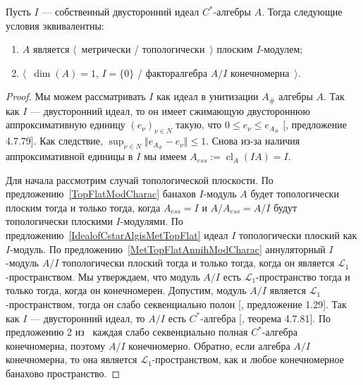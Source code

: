 \begin{proposition}\label{CStarAlgIsTopFlatOverItsIdeal} Пусть $I$ ---
собственный двусторонний идеал $C^*$-алгебры $A$. Тогда следующие условия
эквивалентны: 

\begin{enumerate}[label = (\roman*)]
    \item $A$ является $\langle$~метрически / топологически~$\rangle$ плоским
    $I$-модулем;

    \item $\langle$~$\operatorname{dim}(A)=1$, $I= \{0 \}$ / факторалгебра $A/I$
    конечномерна~$\rangle$.
\end{enumerate}
\end{proposition}
\begin{proof} Мы можем рассматривать $I$ как идеал в унитизации $A_\#$ алгебры
$A$. Так как $I$ --- двусторонний идеал, то он имеет сжимающую двустороннюю
аппроксимативную единицу ${(e_\nu)}_{\nu\in N}$ такую, что $0\leq e_\nu\leq
e_{A_\#}$ [\cite{HelBanLocConvAlg}, предложение 4.7.79]. Как следствие,
$\sup_{\nu\in N}\Vert e_{A_\#}-e_\nu\Vert\leq 1$. Снова из-за наличия
аппроксимативной единицы в $I$ мы имеем $A_{ess}:=\operatorname{cl}_A(IA)=I$.

Для начала рассмотрим случай топологической плоскости. По
предложению~\ref{TopFlatModCharac} банахов $I$-модуль $A$ будет топологически
плоским тогда и только тогда, когда $A_{ess}=I$ и $A/A_{ess}=A/I$ будут
топологически плоскими $I$-модулями. По
предложению~\ref{IdealofCstarAlgisMetTopFlat} идеал $I$ топологически плоский
как $I$-модуль. По предложению~\ref{MetTopFlatAnnihModCharac} аннуляторный
$I$-модуль $A/I$ топологически плоский тогда и только тогда, когда он является
$\mathscr{L}_1$-пространством. Мы утверждаем, что модуль $A/I$ есть
$\mathscr{L}_1$-пространство тогда и только тогда, когда он конечномерен.
Допустим, модуль $A/I$ является $\mathscr{L}_1$-пространством, тогда он слабо
секвенциально полон [\cite{BourgNewClOfLpSp}, предложение 1.29]. Так как $I$ ---
двусторонний идеал, то $A/I$ есть $C^*$-алгебра [\cite{HelBanLocConvAlg},
теорема 4.7.81]. По предложению 2 из~\cite{SakWeakCompOpOnOpAlg} каждая слабо
секвенциально полная $C^*$-алгебра конечномерна, поэтому $A/I$ конечномерно.
Обратно, если алгебра $A/I$ конечномерна, то она является
$\mathscr{L}_1$-пространством, как и любое конечномерное банахово пространство.


\end{proof}
